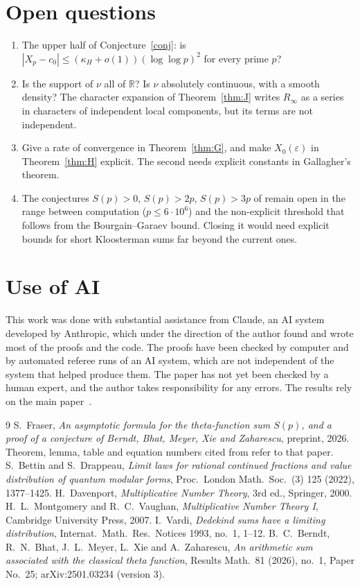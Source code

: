 \documentclass[11pt]{amsart}
\theoremstyle{remark}
\begin{document}
\section{Open questions}
\begin{enumerate}
\item The upper half of Conjecture~\ref{conj}: is $|X_p-c_0|\le(\kappa_H+o(1))(\log\log p)^2$ for every prime $p$?
\item Is the support of $\nu$ all of $\mathbb R$? Is $\nu$ absolutely continuous, with a smooth density? The character expansion of Theorem~\ref{thm:J} writes $R_\infty$ as a series in characters of independent local components, but its terms are not independent.
\item Give a rate of convergence in Theorem~\ref{thm:G}, and make $X_0(\varepsilon)$ in Theorem~\ref{thm:H} explicit. The second needs explicit constants in Gallagher's theorem.
\item The conjectures $S(p)>0$, $S(p)>2p$, $S(p)>3p$ of \cite{BBMXZ} remain open in the range between computation ($p\le6\cdot10^6$) and the non-explicit threshold that follows from the Bourgain--Garaev bound. Closing it would need explicit bounds for short Kloosterman sums far beyond the current ones.
\end{enumerate}

\section*{Use of AI}
This work was done with substantial assistance from Claude, an AI system developed by Anthropic, which under the direction of the author found and wrote most of the proofs and the code. The proofs have been checked by computer and by automated referee runs of an AI system, which are not independent of the system that helped produce them. The paper has not yet been checked by a human expert, and the author takes responsibility for any errors. The results rely on the main paper~\cite{TS}.

\begin{thebibliography}{9}
 S.~Fraser, \emph{An asymptotic formula for the theta-function sum $S(p)$, and a proof of a conjecture of Berndt, Bhat, Meyer, Xie and Zaharescu}, preprint, 2026. Theorem, lemma, table and equation numbers cited from \cite{TS} refer to that paper.
 S.~Bettin and S.~Drappeau, \emph{Limit laws for rational continued fractions and value distribution of quantum modular forms}, Proc.\ London Math.\ Soc.\ (3) 125 (2022), 1377--1425.
 H.~Davenport, \emph{Multiplicative Number Theory}, 3rd ed., Springer, 2000.
 H.~L.~Montgomery and R.~C.~Vaughan, \emph{Multiplicative Number Theory I}, Cambridge University Press, 2007.
 I.~Vardi, \emph{Dedekind sums have a limiting distribution}, Internat.\ Math.\ Res.\ Notices 1993, no.~1, 1--12.
 B.~C.~Berndt, R.~N.~Bhat, J.~L.~Meyer, L.~Xie and A.~Zaharescu, \emph{An arithmetic sum associated with the classical theta function}, Results Math.\ 81 (2026), no.~1, Paper No.~25; arXiv:2501.03234 (version 3).
\end{thebibliography}
\end{document}
